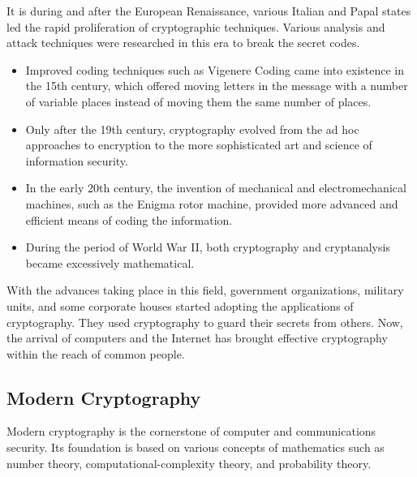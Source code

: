 \documentclass[british]{report}
\begin{document}
It is during and after the European Renaissance, various Italian and
Papal states led the rapid proliferation of cryptographic techniques.
Various analysis and attack techniques were researched in this era
to break the secret codes.
\begin{itemize}
	\item Improved coding techniques such as Vigenere Coding came into existence
	      in the 15th century, which offered moving letters in the message with
	      a number of variable places instead of moving them the same number
	      of places.
	\item Only after the 19th century, cryptography evolved from the ad hoc
	      approaches to encryption to the more sophisticated art and science
	      of information security.
	\item In the early 20th century, the invention of mechanical and electromechanical
	      machines, such as the Enigma rotor machine, provided more advanced
	      and efficient means of coding the information.
	\item During the period of World War II, both cryptography and cryptanalysis
	      became excessively mathematical.
\end{itemize}
With the advances taking place in this field, government organizations,
military units, and some corporate houses started adopting the applications
of cryptography. They used cryptography to guard their secrets from
others. Now, the arrival of computers and the Internet has brought
effective cryptography within the reach of common people.

\subsection{Modern Cryptography}

Modern cryptography is the cornerstone of computer and communications
security. Its foundation is based on various concepts of mathematics
such as number theory, computational-complexity theory, and probability
theory.
\end{document}
